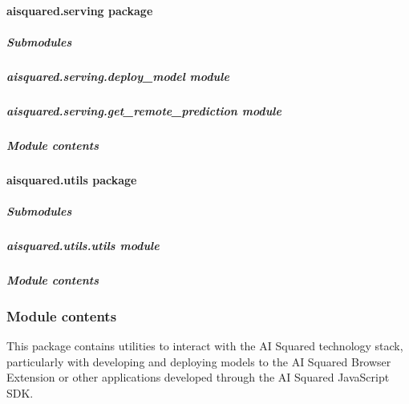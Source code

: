 \documentclass[letterpaper,10pt,english]{sphinxmanual}
\begin{document}
\paragraph{aisquared.serving package}
\label{\detokenize{aisquared.serving:aisquared-serving-package}}\label{\detokenize{aisquared.serving::doc}}

\subparagraph{Submodules}
\label{\detokenize{aisquared.serving:submodules}}

\subparagraph{aisquared.serving.deploy\_model module}
\label{\detokenize{aisquared.serving:aisquared-serving-deploy-model-module}}

\subparagraph{aisquared.serving.get\_remote\_prediction module}
\label{\detokenize{aisquared.serving:aisquared-serving-get-remote-prediction-module}}

\subparagraph{Module contents}
\label{\detokenize{aisquared.serving:module-contents}}
\sphinxstepscope


\paragraph{aisquared.utils package}
\label{\detokenize{aisquared.utils:aisquared-utils-package}}\label{\detokenize{aisquared.utils::doc}}

\subparagraph{Submodules}
\label{\detokenize{aisquared.utils:submodules}}

\subparagraph{aisquared.utils.utils module}
\label{\detokenize{aisquared.utils:aisquared-utils-utils-module}}

\subparagraph{Module contents}
\label{\detokenize{aisquared.utils:module-contents}}

\subsubsection{Module contents}
\label{\detokenize{aisquared:module-aisquared}}\label{\detokenize{aisquared:module-contents}}
\sphinxAtStartPar
This package contains utilities to interact with the AI Squared technology stack, particularly with developing and deploying models to the AI Squared Browser Extension or other applications developed through the AI Squared JavaScript SDK.
\end{document}
